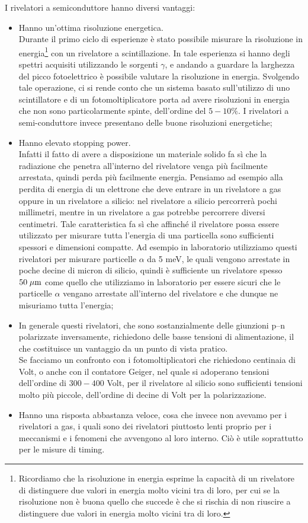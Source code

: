 I rivelatori a semiconduttore hanno diversi vantaggi:
\begin{itemize}[leftmargin=0.5cm]
   \item Hanno un'ottima risoluzione energetica.\\
   Durante il primo ciclo di esperienze è stato possibile misurare la risoluzione in energia\footnote{Ricordiamo che la risoluzione in energia esprime la capacità di un rivelatore di distinguere due valori in energia molto vicini tra di loro, per cui se la risoluzione non è buona quello che succede è che si rischia di non riuscire a distinguere due valori in energia molto vicini tra di loro.} con un rivelatore a scintillazione. In tale esperienza si hanno degli spettri acquisiti utilizzando le sorgenti $\gamma$, e andando a guardare la larghezza del picco fotoelettrico è possibile valutare la risoluzione in energia. Svolgendo tale operazione, ci si rende conto che un sistema basato sull'utilizzo di uno scintillatore e di un fotomoltiplicatore porta ad avere risoluzioni in energia che non sono particolarmente spinte, dell'ordine del $5-10\%$. I rivelatori a semi-conduttore invece presentano delle buone risoluzioni energetiche;
   \item Hanno elevato stopping power.\\
   Infatti il fatto di avere a disposizione un materiale solido fa sì che la radiazione che penetra all'interno del rivelatore venga più facilmente arrestata, quindi perda più facilmente energia. Pensiamo ad esempio alla perdita di energia di un elettrone che deve entrare in un rivelatore a gas oppure in un rivelatore a silicio: nel rivelatore a silicio percorrerà pochi millimetri, mentre in un rivelatore a gas potrebbe percorrere diversi centimetri. Tale caratteristica fa sì che affinché il rivelatore possa essere utilizzato per misurare tutta l'energia di una particella sono sufficienti spessori e dimensioni compatte. Ad esempio in laboratorio utilizziamo questi rivelatori per misurare particelle $\alpha$ da 5 meV, le quali vengono arrestate in poche decine di micron di silicio, quindi è sufficiente un rivelatore spesso $50 \; \rm \mu m$ come quello che utilizziamo in laboratorio per essere sicuri che le particelle $\alpha$ vengano arrestate all'interno del rivelatore e che dunque ne misuriamo tutta l'energia;
   \item In generale questi rivelatori, che sono sostanzialmente delle giunzioni p--n polarizzate inversamente, richiedono delle basse tensioni di alimentazione, il che costituisce un vantaggio da un punto di vista pratico.\\
   Se facciamo un confronto con i fotomoltiplicatori che richiedono centinaia di Volt, o anche con il contatore Geiger, nel quale si adoperano tensioni dell'ordine di $300-400$ Volt, per il rivelatore al silicio sono sufficienti tensioni molto più piccole, dell'ordine di decine di Volt per la polarizzazione.
   \item Hanno una risposta abbastanza veloce, cosa che invece non avevamo per i rivelatori a gas, i quali sono dei rivelatori piuttosto lenti proprio per i meccanismi e i fenomeni che avvengono al loro interno. Ciò è utile soprattutto per le misure di timing.
\end{itemize}

